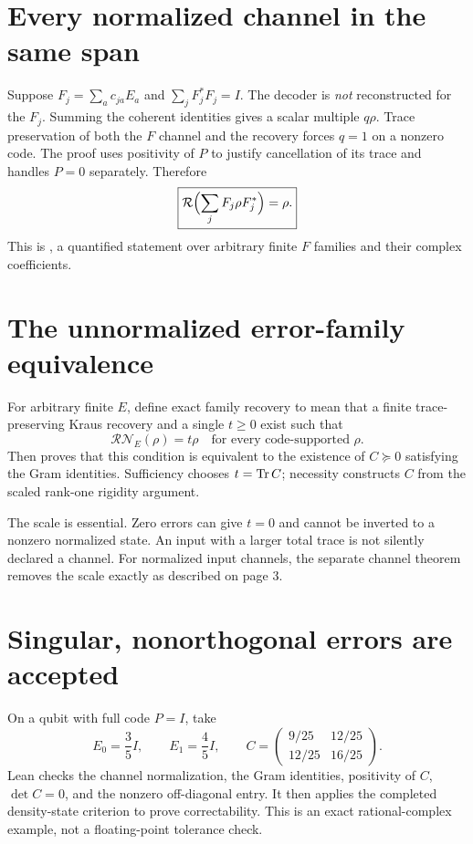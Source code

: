 \documentclass[10pt,letterpaper]{article}
\newcommand{\pageheading}[2]{\vspace*{2pt}{\small\color{ink}\textsc{#1}}\par\vspace{2pt}{\Large\bfseries #2}\par\vspace{4pt}}
\begin{document}
\section*{Every normalized channel in the same span}
Suppose $F_j=\sum_a c_{ja}E_a$ and $\sum_jF_j^*F_j=I$. The decoder is \emph{not} reconstructed for the $F_j$. Summing the coherent identities gives a scalar multiple $q\rho$. Trace preservation of both the $F$ channel and the recovery forces $q=1$ on a nonzero code. The proof uses positivity of $P$ to justify cancellation of its trace and handles $P=0$ separately. Therefore
\[
\boxed{\mathcal R\Bigl(\sum_jF_j\rho F_j^*\Bigr)=\rho.}
\]
This is , a quantified statement over arbitrary finite $F$ families and their complex coefficients.

\section*{The unnormalized error-family equivalence}
For arbitrary finite $E$, define exact family recovery to mean that a finite trace-preserving Kraus recovery and a single $t\ge0$ exist such that
\[
\mathcal R\mathcal N_E(\rho)=t\rho
\quad\text{for every code-supported }\rho.
\]
Then  proves that this condition is equivalent to the existence of $C\succeq0$ satisfying the Gram identities. Sufficiency chooses $t=\operatorname{Tr} C$; necessity constructs $C$ from the scaled rank-one rigidity argument.

The scale is essential. Zero errors can give $t=0$ and cannot be inverted to a nonzero normalized state. An input with a larger total trace is not silently declared a channel. For normalized input channels, the separate channel theorem removes the scale exactly as described on page 3.

\newpage
\pageheading{Validation and boundary}{Exact examples, trust audit and remaining work}
\section*{Singular, nonorthogonal errors are accepted}
On a qubit with full code $P=I$, take
\[
E_0=\frac35I,\qquad E_1=\frac45I,\qquad
C=\begin{pmatrix}9/25&12/25\\12/25&16/25\end{pmatrix}.
\]
Lean checks the channel normalization, the Gram identities, positivity of $C$, $\det C=0$, and the nonzero off-diagonal entry. It then applies the completed density-state criterion to prove correctability. This is an exact rational-complex example, not a floating-point tolerance check.
\end{document}
